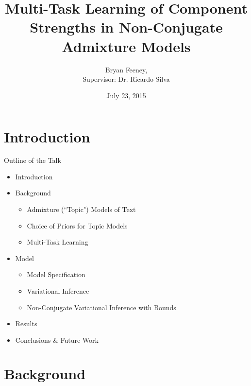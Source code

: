 \documentclass[xcolor=dvipsnames]{beamer}
\author{Bryan Feeney, \\
Supervisor: Dr. Ricardo Silva}
\title[Multitask Admixture Prediction]{Multi-Task Learning of Component Strengths in Non-Conjugate Admixture Models}
\institute[University College London]{
 University College London
}
\date[July 23, 2015]{July 23, 2015}
\begin{document}


\begin{frame}[plain]
  \titlepage
\end{frame}






\section{Introduction}
\begin{frame}{Outline of the Talk}

\begin{itemize}
    \item<1-> Introduction
    \item<2-> Background
     {
        \begin{itemize}
            \item Admixture (``Topic") Models of Text
            \item Choice of Priors for Topic Models
            \item Multi-Task Learning
        \end{itemize}
    }
    \item<3-> Model
     {
        \begin{itemize}
            \item Model Specification
            \item Variational Inference
            \item Non-Conjugate Variational Inference with Bounds
        \end{itemize}
    }
    \item<4-> Results
    \item<5->Conclusions \& Future Work
\end{itemize}


\end{frame}


\section{Background}
\end{document}
